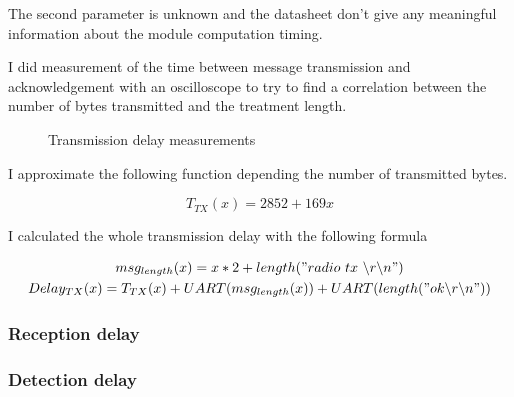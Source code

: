 The second parameter is unknown and the datasheet don't give any meaningful
information about the module computation timing.

I did measurement of the time between message transmission and acknowledgement
with an oscilloscope to try to find a correlation between the number of bytes
transmitted and the treatment length.

\begin{figure}[H]
  \centering


  \caption{Transmission delay measurements\label{fig:transmissiondelay}}
\end{figure}

I approximate the following function depending the number of transmitted bytes.

\begin{equation}
  \label{eq:transmissioncompute}
  T_{TX}(x) = 2852 + 169x
\end{equation}

I calculated the whole transmission delay with the following formula

\begin{gather}
  \label{eq:transmissiondelay}
  msg_{length}(x) = x * 2 + length("radio~tx~\backslash r \backslash n") \\
  Delay_{TX}(x) = T_{TX}(x) + UART(msg_{length}(x)) + UART(length("ok \backslash r\backslash n"))
\end{gather}

\subsubsection{Reception delay}

\subsubsection{Detection delay}

